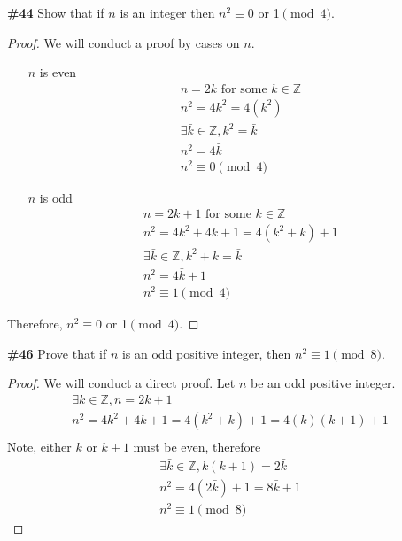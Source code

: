 \documentclass{article}
\newcommand{\problem}[1]{\textbf{\##1}}
\newcommand{\prob}[1]{\problem{#1}}
\newcommand{\AllIntegers}{\mathbb{Z}}
\begin{document}
\prob{44}
Show that if \(n\) is an integer then \(n^2 \equiv 0\) or 1\(\pmod 4\).
\begin{proof}
    We will conduct a proof by cases on \(n\). 
    \begin{enumerate}
        \item [\(n\) is even]
        \begin{align*}
            n = 2k \text{ for some } k \in \AllIntegers\\
            n^2 = 4k^2 = 4(k^2)\\
            \exists \bar{k} \in \AllIntegers, k^2 = \bar{k}\\
            n^2 = 4\bar{k}\\
            n^2 \equiv 0 \pmod 4
        \end{align*}
        \item [\(n\) is odd]
        \begin{align*}
            n = 2k + 1 \text{ for some } k \in \AllIntegers\\
            n^2 = 4k^2 + 4k + 1 = 4(k^2 + k) + 1\\
            \exists \bar{k} \in \AllIntegers, k^2 + k = \bar{k}\\
            n^2 = 4\bar{k} + 1\\
            n^2 \equiv 1 \pmod 4
        \end{align*}
    \end{enumerate}
    Therefore, \(n^2 \equiv 0\) or 1\(\pmod 4\).
\end{proof}
\pagebreak

\prob{46}
Prove that if \(n\) is an odd positive integer, then \(n^2 \equiv 1 \pmod 8\).
\begin{proof}
    We will conduct a direct proof. Let \(n\) be an odd positive integer.
    \begin{align*}
        \exists k \in \AllIntegers, n = 2k + 1\\
        n^2 = 4k^2 + 4k + 1 = 4(k^2 + k) + 1 = 4(k)(k+1) + 1\\
    \end{align*}
    Note, either \(k\) or \(k+1\) must be even, therefore
    \begin{align*}
        \exists \bar{k} \in \AllIntegers, k(k+1) = 2\bar{k}\\
        n^2 = 4(2\bar{k}) + 1 = 8\bar{k} + 1\\
        n^2 \equiv 1 \pmod 8
    \end{align*}
\end{proof}
\pagebreak
\end{document}

